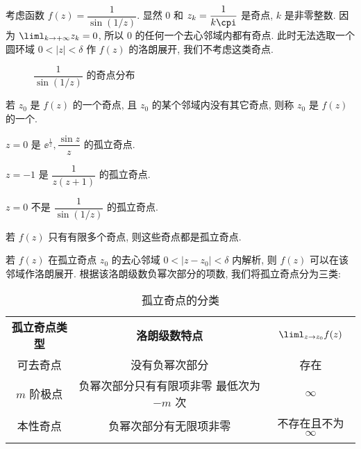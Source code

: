 \begin{example}
  考虑函数 $f(z)=\dfrac1{\sin(1/z)}$.
  显然 $0$ 和 $z_k=\dfrac1{k\cpi}$ 是奇点, $k$ 是非零整数.
  因为 $\liml_{k\ra+\infty} z_k=0$, 所以 $0$ 的任何一个去心邻域内都有奇点.
  此时无法选取一个圆环域 $0<|z|<\delta$ 作 $f(z)$ 的洛朗展开, 我们不考虑这类奇点.
\end{example}

\begin{figure}[!hbt]
  \centering
  \caption{$\dfrac1{\sin(1/z)}$ 的奇点分布}
\end{figure}

\begin{definition}
  若 $z_0$ 是 $f(z)$ 的一个奇点, 且 $z_0$ 的某个邻域内没有其它奇点, 则称 $z_0$ 是 $f(z)$ 的一个.
\end{definition}

\begin{exampleenum}
  \item $z=0$ 是 $\ee^{\frac1z},\dfrac{\sin z}z$ 的孤立奇点.
  \item $z=-1$ 是 $\dfrac1{z(z+1)}$ 的孤立奇点.
  \item $z=0$ 不是 $\dfrac1{\sin(1/z)}$ 的孤立奇点.
\end{exampleenum}

若 $f(z)$ 只有有限多个奇点, 则这些奇点都是孤立奇点.

若 $f(z)$ 在孤立奇点 $z_0$ 的去心邻域 $0<|z-z_0|<\delta$ 内解析, 则 $f(z)$ 可以在该邻域作洛朗展开.
根据该洛朗级数负幂次部分的项数, 我们将孤立奇点分为三类:

\begin{table}[!htb]
  \centering
  \begin{tabular}{ccc}
    \topcolorrule
      \bf 孤立奇点类型&
      \bf 洛朗级数特点&
      $\liml_{z\ra z_0}f(z)$\\
    \topcolorrule
      可去奇点&
      没有负幂次部分&
      存在\\
    \midcolorrule
      $m$ 阶极点&
      \makecell{负幂次部分只有有限项非零\\最低次为 $-m$ 次}&
      $\infty$\\
    \midcolorrule
      本性奇点&
      负幂次部分有无限项非零&
      不存在且不为 $\infty$\\
    \bottomcolorrule
  \end{tabular}
  \caption{孤立奇点的分类}
\end{table}


